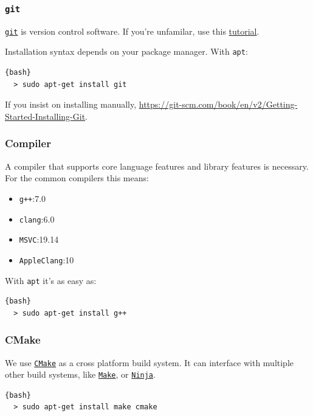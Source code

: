 \documentclass{beamer}
\begin{document}
\begin{frame}[fragile]
  \frametitle{\texttt{git}}

\href{https://git-scm.com/}{\texttt{git}} is version control software. 
If you're unfamilar, use this 
\href{https://git-scm.com/docs/gittutorial}{tutorial}.  \vspace{0.5cm}

Installation syntax depends on your package manager. With \texttt{apt}:

\begin{lstlisting}{bash}
  > sudo apt-get install git
\end{lstlisting}

If you insist on installing manually, 
\href{https://git-scm.com/book/en/v2/Getting-Started-Installing-Git}
{https://git-scm.com/book/en/v2/Getting-Started-Installing-Git}.

\end{frame}

\begin{frame}[fragile]
\frametitle{Compiler}
A compiler that supports  core language features and library 
features is necessary. For the common compilers this means:

\begin{itemize}
  \item \texttt{g++}:\@ 7.0
  \item \texttt{clang}:\@ 6.0
  \item \texttt{MSVC}:\@ 19.14
  \item \texttt{AppleClang}:\@ 10
\end{itemize}


\vspace{0.4cm}
With \texttt{apt} it's as easy as:
\begin{lstlisting}{bash}
  > sudo apt-get install g++
\end{lstlisting}

\end{frame}

\begin{frame}[fragile]
\frametitle{CMake}

We use \href{https://cmake.org/}{\texttt{CMake}} 
as a cross platform build system. 
It can interface with multiple other build systems, 
like \href{https://www.gnu.org/software/make/}{\texttt{Make}}, 
or \href{https://ninja-build.org/}{\texttt{Ninja}}.

\begin{lstlisting}{bash}
  > sudo apt-get install make cmake
\end{lstlisting}
\end{frame}
\end{document}
